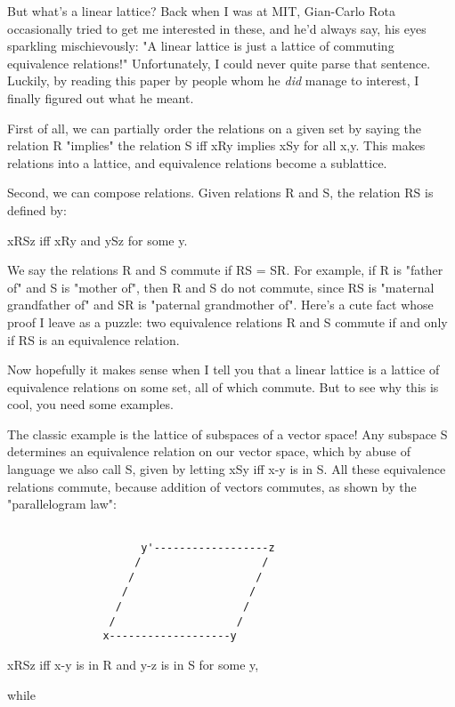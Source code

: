 But what's a linear lattice?   Back when I was at MIT, Gian-Carlo Rota
occasionally tried to get me interested in these, and he'd always say,
his eyes sparkling mischievously: "A linear lattice is just a lattice of
commuting equivalence relations!"  Unfortunately, I could never quite
parse that sentence.  Luckily, by reading this paper by people whom he
\emph{did} manage to interest, I finally figured out what he meant.


First of all, we can partially order the relations on a given set by
saying the relation R "implies" the relation S iff xRy implies
xSy for all x,y.  This makes relations into a lattice, and equivalence
relations become a sublattice.

Second, we can compose relations.  Given relations R and S, the 
relation RS is defined by:

xRSz iff xRy and ySz for some y.


We say the relations R and S commute if RS = SR.  For example, if R is
"father of" and S is "mother of", then R and S do
not commute, since RS is "maternal grandfather of" and SR is
"paternal grandmother of".  Here's a cute fact whose proof I
leave as a puzzle: two equivalence relations R and S commute if and only
if RS is an equivalence relation.

Now hopefully it makes sense when I tell you that a linear lattice is a
lattice of equivalence relations on some set, all of which commute.  But
to see why this is cool, you need some examples.  

The classic example is the lattice of subspaces of a vector space!  Any
subspace S determines an equivalence relation on our vector space, which
by abuse of language we also call S, given by letting xSy iff x-y is in
S.  All these equivalence relations commute, because addition of vectors
commutes, as shown by the "parallelogram law":

                         

\begin{verbatim}

                     y'------------------z
                    /                   /
                   /                   /
                  /                   /  
                 /                   /
                /                   /
               x-------------------y
\end{verbatim}
    
xRSz iff x-y is in R and y-z is in S for some y, 

while


